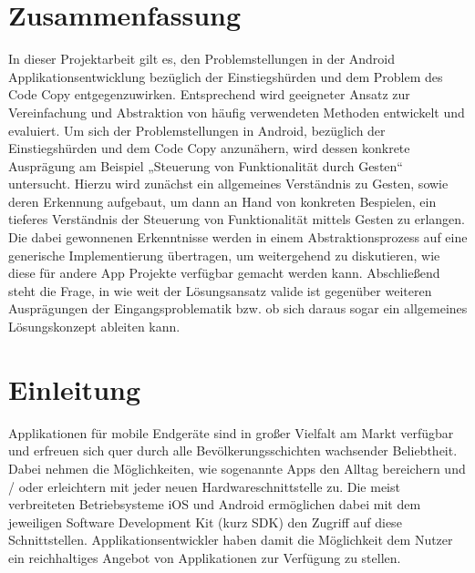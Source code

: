 \documentclass[12pt,oneside,a4paper,bibtotoc,liststotoc]{scrreprt}
\begin{document}
\onehalfspacing %

\chapter*{Zusammenfassung}
In dieser Projektarbeit gilt es, den Problemstellungen in der Android Applikationsentwicklung bezüglich der Einstiegshürden und dem Problem des Code Copy entgegenzuwirken. Entsprechend wird geeigneter Ansatz zur Vereinfachung und Abstraktion von häufig verwendeten Methoden entwickelt und evaluiert.
Um sich der Problemstellungen in Android, bezüglich der Einstiegshürden und dem Code Copy anzunähern, wird dessen konkrete Ausprägung am Beispiel „Steuerung von Funktionalität durch Gesten“ untersucht. Hierzu wird zunächst ein allgemeines Verständnis zu Gesten, sowie deren Erkennung aufgebaut, um dann an Hand von konkreten Bespielen, ein tieferes Verständnis der Steuerung von Funktionalität mittels Gesten zu erlangen. Die dabei gewonnenen Erkenntnisse werden in einem Abstraktionsprozess auf eine generische Implementierung übertragen, um weitergehend zu diskutieren, wie diese für andere App Projekte verfügbar gemacht werden kann.\newline
Abschließend steht die Frage, in wie weit der Lösungsansatz valide ist gegenüber weiteren Ausprägungen der Eingangsproblematik bzw. ob sich daraus sogar ein allgemeines Lösungskonzept ableiten kann.
\tableofcontents
\listoffigures


\chapter{Einleitung}
Applikationen für mobile Endgeräte sind in großer Vielfalt am Markt verfügbar und erfreuen sich quer durch alle Bevölkerungsschichten wachsender Beliebtheit. Dabei nehmen die Möglichkeiten, wie sogenannte Apps den Alltag bereichern und / oder erleichtern mit jeder neuen Hardwareschnittstelle zu. Die meist verbreiteten Betriebsysteme iOS und Android ermöglichen dabei mit dem jeweiligen Software Development Kit (kurz SDK) den Zugriff auf diese Schnittstellen. Applikationsentwickler haben damit die Möglichkeit dem Nutzer ein reichhaltiges Angebot von Applikationen zur Verfügung zu stellen.
\end{document}
